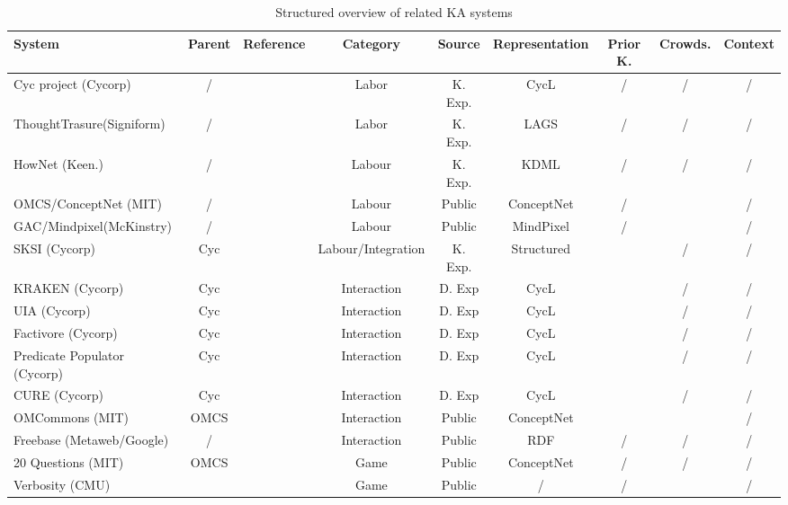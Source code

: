 \begin{landscape}
	\begin{table}[htb]
	\caption{Structured overview of related KA systems}
	\label{tab:related}
	\centering
	\begin{adjustbox}{width=1.4\textwidth}
	\begin{tabular}{lclcccccc}
		\hline
		System & Parent & Reference & Category & Source & Representation & Prior K. &  Crowds. & Context \\
		\hline
		Cyc project (Cycorp) & / & \parencite{Lenat1995} & Labor & K. Exp. & CycL & / & / & / \\
		ThoughtTrasure(Signiform) & / & \parencite{Mueller2003} & Labor & K. Exp. & LAGS & / & / & / \\
		HowNet (Keen.) & / & \parencite{Dong2010} & Labour & K. Exp. & KDML & / & / & / \\
		OMCS/ConceptNet (MIT) & / & \parencite{Singh2002a} & Labour & Public & ConceptNet & / & \checkmark & / \\
		GAC/Mindpixel(McKinstry) & / & \parencite{McKinstry2008} & Labour & Public & MindPixel & / & \checkmark & / \\
	    SKSI (Cycorp) & Cyc & \parencite{Masters2007} & Labour/Integration & K. Exp. &  Structured & \checkmark & / & / \\
		KRAKEN (Cycorp) & Cyc & \parencite{Panton2002a} & Interaction & D. Exp & CycL & \checkmark & / & / \\
		UIA (Cycorp) & Cyc & \parencite{Witbrock2003UIA} & Interaction & D. Exp & CycL & \checkmark & / & / \\
		Factivore (Cycorp) & Cyc & \parencite{Witbrock2005} & Interaction & D. Exp & CycL & \checkmark & / & / \\
		Predicate Populator (Cycorp) & Cyc & \parencite{Witbrock2005} & Interaction & D. Exp & CycL & \checkmark & / & / \\
		CURE (Cycorp) & Cyc & \parencite{Witbrock2010} & Interaction & D. Exp & CycL & \checkmark & / & / \\
		OMCommons (MIT) & OMCS & \parencite{Speer2007} & Interaction & Public & ConceptNet & \checkmark & \checkmark & / \\
		Freebase (Metaweb/Google) & / & \parencite{Bollacker2008} & Interaction & Public & RDF & / & / & / \\
		20 Questions (MIT) & OMCS & \parencite{Speer2009} & Game & Public & ConceptNet & / & / & / \\
		Verbosity (CMU) &   & \parencite{VonAhn2006a}  & Game & Public & /  & /  & \checkmark  & /  \\

\end{tabular}
\end{adjustbox}
\end{table}
\end{landscape}
